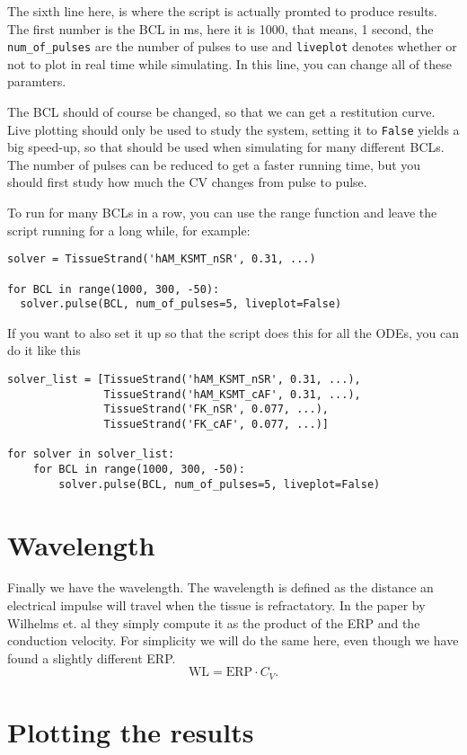 \documentclass[a4paper, 11pt, notitlepage, english]{article}
\begin{document}
The sixth line here, is where the script is actually promted to produce results. The first number is the BCL in ms, here it is 1000, that means, 1 second, the \verb+num_of_pulses+ are the number of pulses to use and \verb+liveplot+ denotes whether or not to plot in real time while simulating. In this line, you can change all of these paramters.

The BCL should of course be changed, so that we can get a restitution curve. Live plotting should only be used to study the system, setting it to \verb+False+ yields a big speed-up, so that should be used when simulating for many different BCLs. The number of pulses can be reduced to get a faster running time, but you should first study how much the CV changes from pulse to pulse.

To run for many BCLs in a row, you can use the range function and leave the script running for a long while, for example:
\begin{lstlisting}
solver = TissueStrand('hAM_KSMT_nSR', 0.31, ...)

for BCL in range(1000, 300, -50):
  solver.pulse(BCL, num_of_pulses=5, liveplot=False)
\end{lstlisting}

If you want to also set it up so that the script does this for all the ODEs, you can do it like this
\begin{lstlisting}
solver_list = [TissueStrand('hAM_KSMT_nSR', 0.31, ...),
               TissueStrand('hAM_KSMT_cAF', 0.31, ...),
               TissueStrand('FK_nSR', 0.077, ...),
               TissueStrand('FK_cAF', 0.077, ...)]

for solver in solver_list:  
    for BCL in range(1000, 300, -50):
        solver.pulse(BCL, num_of_pulses=5, liveplot=False)
\end{lstlisting}


\section*{Wavelength}

Finally we have the wavelength. The wavelength is defined as the distance an electrical impulse will travel when the tissue is refractatory. In the paper by Wilhelms et. al they simply compute it as the product of the ERP and the conduction velocity. For simplicity we will do the same here, even though we have found a slightly different ERP.
$$\mbox{WL} = \mbox{ERP} \cdot C_V.$$

\section*{Plotting the results}
\end{document}
